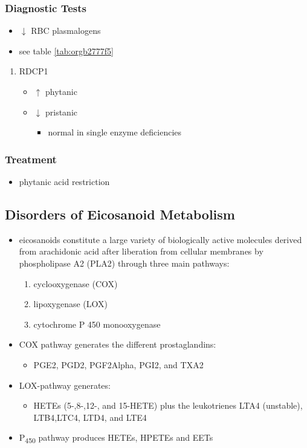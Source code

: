 \documentclass[12pt]{scrartcl}
\begin{document}
\subsubsection{Diagnostic Tests}
\label{sec:orga3c36c7}
\begin{itemize}
\item \(\downarrow\) RBC plasmalogens
\item see table \ref{tab:orgb2777f5}
\end{itemize}
\begin{enumerate}
\item RDCP1
\label{sec:orga3b9ed8}
\begin{itemize}
\item \(\uparrow\) phytanic
\item \(\downarrow\) pristanic
\begin{itemize}
\item normal in single enzyme deficiencies
\end{itemize}
\end{itemize}
\end{enumerate}

\subsubsection{Treatment}
\label{sec:orgdd76789}
\begin{itemize}
\item phytanic acid restriction
\end{itemize}

\subsection{Disorders of Eicosanoid Metabolism}
\label{sec:org8dc6e0d}
\begin{itemize}
\item eicosanoids constitute a large variety of biologically active
molecules derived from arachidonic acid after liberation from
cellular membranes by phospholipase A2 (PLA2) through three main
pathways:
\begin{enumerate}
\item cyclooxygenase (COX)
\item lipoxygenase (LOX)
\item cytochrome P 450 monooxygenase
\end{enumerate}

\item COX pathway generates the different prostaglandins:
\begin{itemize}
\item PGE2, PGD2, PGF2Alpha, PGI2, and TXA2
\end{itemize}

\item LOX-pathway generates:
\begin{itemize}
\item HETEs (5-,8-,12-, and 15-HETE) plus the leukotrienes LTA4
(unstable), LTB4,LTC4, LTD4, and LTE4
\end{itemize}

\item P\textsubscript{450} pathway produces HETEs, HPETEs and EETs
\end{itemize}
\end{document}
